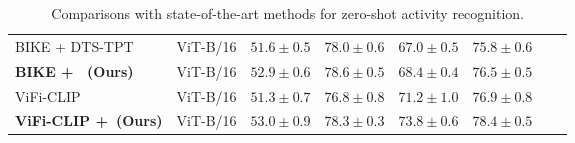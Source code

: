\begin{table*}
\begin{tabular}{lccccccc}
		{BIKE + DTS-TPT~\cite{yan_2024_DTSTPT}}              & ViT-B/16     &${51.6 \pm 0.5}$  &${78.0 \pm 0.6}$     &${67.0 \pm 0.5}$ &${75.8 \pm0.6}$    \\
		\textbf{BIKE + \testv~(Ours)}              & ViT-B/16     &$\mathbf{52.9\pm0.6}$  &$\mathbf{78.6\pm0.5}$     &$\mathbf{68.4\pm0.4}$ &$\mathbf{76.5\pm0.5}$    \\
		\cmidrule(l{1em}r{1em}){1-6}
		ViFi-CLIP~\cite{hanoonavificlip}           & ViT-B/16     &$51.3\pm0.7$ &$76.8\pm0.8$     &$71.2\pm1.0$ & $76.9\pm0.8$    \\
		\textbf{ViFi-CLIP +\testv~(Ours)}          & ViT-B/16     &$\mathbf{53.0\pm0.9}$   &$\mathbf{78.3\pm0.3}$     &$\mathbf{73.8\pm0.6}$ & $\mathbf{78.4\pm0.5}$    \\
		\bottomrule[1pt]
		
		
	\end{tabular}
	\caption{Comparisons with state-of-the-art methods for zero-shot activity recognition.
	} 
	\label{tab:sota}
\end{table*}